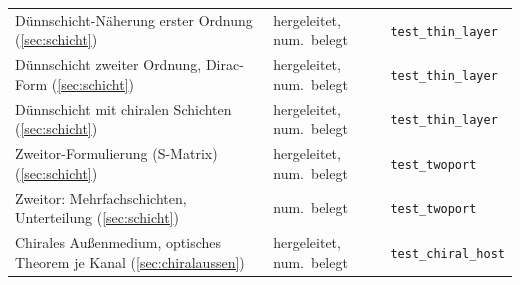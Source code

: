 \documentclass[11pt, a4paper]{article}
\theoremstyle{plain}
\theoremstyle{definition}
\begin{document}
\begin{center}
\begin{tabular}{lll}
Dünnschicht-Näherung erster Ordnung (\ref{sec:schicht}) & hergeleitet, num.\ belegt & \texttt{test\_thin\_layer}\\
Dünnschicht zweiter Ordnung, Dirac-Form (\ref{sec:schicht}) & hergeleitet, num.\ belegt & \texttt{test\_thin\_layer}\\
Dünnschicht mit chiralen Schichten (\ref{sec:schicht}) & hergeleitet, num.\ belegt & \texttt{test\_thin\_layer}\\
Zweitor-Formulierung (S-Matrix) (\ref{sec:schicht}) & hergeleitet, num.\ belegt & \texttt{test\_twoport}\\
Zweitor: Mehrfachschichten, Unterteilung (\ref{sec:schicht}) & num.\ belegt & \texttt{test\_twoport}\\
Chirales Außenmedium, optisches Theorem je Kanal (\ref{sec:chiralaussen}) & hergeleitet, num.\ belegt & \texttt{test\_chiral\_host}\\
\bottomrule
\end{tabular}
\end{center}
\end{document}
